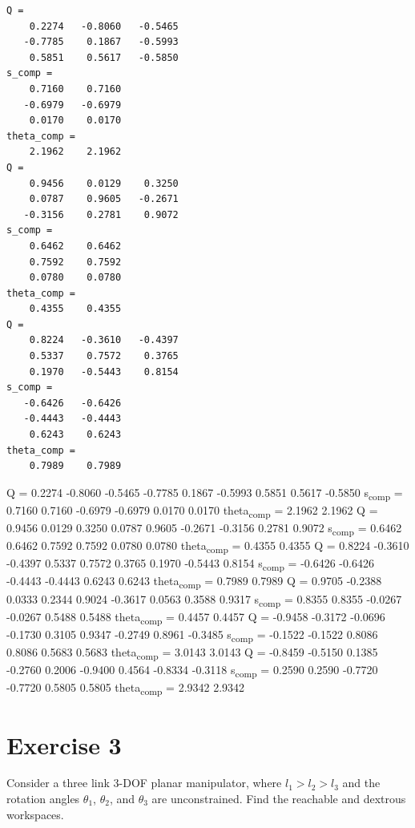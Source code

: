 \documentclass[11pt]{article}
\begin{document}
\begin{verbatim}
Q =
    0.2274   -0.8060   -0.5465
   -0.7785    0.1867   -0.5993
    0.5851    0.5617   -0.5850
s_comp =
    0.7160    0.7160
   -0.6979   -0.6979
    0.0170    0.0170
theta_comp =
    2.1962    2.1962
Q =
    0.9456    0.0129    0.3250
    0.0787    0.9605   -0.2671
   -0.3156    0.2781    0.9072
s_comp =
    0.6462    0.6462
    0.7592    0.7592
    0.0780    0.0780
theta_comp =
    0.4355    0.4355
Q =
    0.8224   -0.3610   -0.4397
    0.5337    0.7572    0.3765
    0.1970   -0.5443    0.8154
s_comp =
   -0.6426   -0.6426
   -0.4443   -0.4443
    0.6243    0.6243
theta_comp =
    0.7989    0.7989
\end{verbatim}
Q =
    0.2274   -0.8060   -0.5465
   -0.7785    0.1867   -0.5993
    0.5851    0.5617   -0.5850
s\textsubscript{comp} =
    0.7160    0.7160
   -0.6979   -0.6979
    0.0170    0.0170
theta\textsubscript{comp} =
    2.1962    2.1962
Q =
    0.9456    0.0129    0.3250
    0.0787    0.9605   -0.2671
   -0.3156    0.2781    0.9072
s\textsubscript{comp} =
    0.6462    0.6462
    0.7592    0.7592
    0.0780    0.0780
theta\textsubscript{comp} =
    0.4355    0.4355
Q =
    0.8224   -0.3610   -0.4397
    0.5337    0.7572    0.3765
    0.1970   -0.5443    0.8154
s\textsubscript{comp} =
   -0.6426   -0.6426
   -0.4443   -0.4443
    0.6243    0.6243
theta\textsubscript{comp} =
    0.7989    0.7989
Q =
    0.9705   -0.2388    0.0333
    0.2344    0.9024   -0.3617
    0.0563    0.3588    0.9317
s\textsubscript{comp} =
    0.8355    0.8355
   -0.0267   -0.0267
    0.5488    0.5488
theta\textsubscript{comp} =
    0.4457    0.4457
Q =
   -0.9458   -0.3172   -0.0696
   -0.1730    0.3105    0.9347
   -0.2749    0.8961   -0.3485
s\textsubscript{comp} =
   -0.1522   -0.1522
    0.8086    0.8086
    0.5683    0.5683
theta\textsubscript{comp} =
    3.0143    3.0143
Q =
   -0.8459   -0.5150    0.1385
   -0.2760    0.2006   -0.9400
    0.4564   -0.8334   -0.3118
s\textsubscript{comp} =
    0.2590    0.2590
   -0.7720   -0.7720
    0.5805    0.5805
theta\textsubscript{comp} =
    2.9342    2.9342

\section{Exercise 3}
\label{sec:org37ee4c4}
Consider a three link 3-DOF planar manipulator, where \(l_1 > l_2 > l_3\) and the rotation angles \(\theta_1\), \(\theta_2\), and \(\theta_3\) are unconstrained.
Find the reachable and dextrous workspaces.
\end{document}
